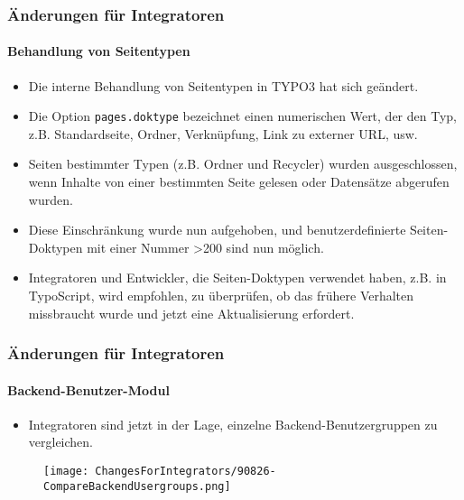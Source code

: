 \begin{frame}[fragile]
	\frametitle{Änderungen für Integratoren}
	\framesubtitle{Behandlung von Seitentypen}

	\begin{itemize}
		\item Die interne Behandlung von Seitentypen in TYPO3 hat sich geändert.
		\item Die Option \texttt{pages.doktype} bezeichnet einen numerischen Wert, der den Typ,
			z.B. Standardseite, Ordner, Verknüpfung, Link zu externer URL, usw.
		\item Seiten bestimmter Typen (z.B. Ordner und Recycler) wurden ausgeschlossen, wenn Inhalte
			von einer bestimmten Seite gelesen oder Datensätze abgerufen wurden.
		\item Diese Einschränkung wurde nun aufgehoben, und benutzerdefinierte Seiten-Doktypen mit einer 
			Nummer >200 sind nun möglich.
		\item Integratoren und Entwickler, die Seiten-Doktypen verwendet haben, z.B. in TypoScript,
			wird empfohlen, zu überprüfen, ob das frühere Verhalten missbraucht wurde und jetzt eine Aktualisierung erfordert.
	\end{itemize}

\end{frame}


\begin{frame}[fragile]
	\frametitle{Änderungen für Integratoren}
	\framesubtitle{Backend-Benutzer-Modul}

	\begin{itemize}
		\item Integratoren sind jetzt in der Lage, einzelne Backend-Benutzergruppen zu vergleichen.
	\end{itemize}

	\begin{figure}
		\texttt{[image: ChangesForIntegrators/90826-CompareBackendUsergroups.png]}
	\end{figure}

\end{frame}


